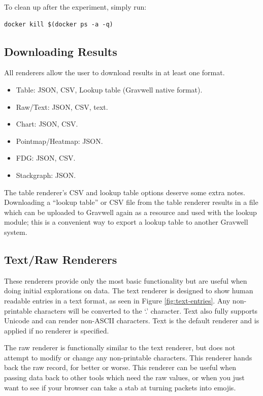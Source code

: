 To clean up after the experiment, simply run:

\begin{Verbatim}[breaklines=true]
docker kill $(docker ps -a -q)
\end{Verbatim}


\subsection{Downloading Results}
All renderers allow the user to download results in at least one
format.

\begin{itemize}
\item
  Table: JSON, CSV, Lookup table (Gravwell native format).
\item
  Raw/Text: JSON, CSV, text.
\item
  Chart: JSON, CSV.
\item
  Pointmap/Heatmap: JSON.
\item
  FDG: JSON, CSV.
\item
  Stackgraph: JSON.
\end{itemize}

The table renderer's CSV and lookup table options deserve some extra notes.
Downloading a ``lookup table'' or CSV file
from the table renderer results in a file which can be uploaded to
Gravwell again as a resource and used with the lookup module; this is a
convenient way to export a lookup table to another Gravwell system.


\subsection{Text/Raw Renderers}
These renderers provide only the most basic functionality but are
useful when doing initial explorations on data. The text renderer is
designed to show human readable entries in a text format, as seen in Figure \ref{fig:text-entries}. Any
non-printable characters will be converted to the `.' character. Text
also fully supports Unicode and can render non-ASCII characters. Text is
the default renderer and is applied if no renderer is specified.

The raw renderer is functionally similar to the text renderer, but does
not attempt to modify or change any non-printable characters. This
renderer hands back the raw record, for better or worse. This renderer
can be useful when passing data back to other tools which need the raw
values, or when you just want to see if your browser can take a stab at
turning packets into emojis.

